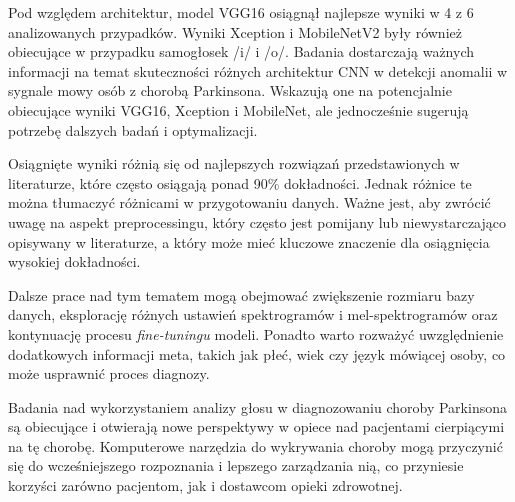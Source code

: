 Pod względem architektur, model VGG16 osiągnął najlepsze wyniki w 4 z 6 analizowanych przypadków.
Wyniki Xception i MobileNetV2 były również obiecujące w przypadku samogłosek /i/ i /o/.
Badania dostarczają ważnych informacji na temat skuteczności różnych architektur CNN w detekcji anomalii w sygnale mowy osób z chorobą Parkinsona.
Wskazują one na potencjalnie obiecujące wyniki VGG16, Xception i MobileNet, ale jednocześnie sugerują potrzebę dalszych badań i optymalizacji.

Osiągnięte wyniki  różnią się od najlepszych rozwiązań przedstawionych w literaturze, które często osiągają ponad 90\% dokładności.
Jednak różnice te można tłumaczyć różnicami w przygotowaniu danych.
Ważne jest, aby zwrócić uwagę na aspekt preprocessingu, który często jest pomijany lub niewystarczająco opisywany w literaturze, a który może mieć kluczowe znaczenie dla osiągnięcia wysokiej dokładności.

Dalsze prace nad tym tematem mogą obejmować zwiększenie rozmiaru bazy danych, eksplorację różnych ustawień spektrogramów i mel-spektrogramów oraz kontynuację procesu \emph{fine-tuningu} modeli.
Ponadto warto rozważyć uwzględnienie dodatkowych informacji meta, takich jak płeć, wiek czy język mówiącej osoby, co może usprawnić proces diagnozy.

Badania nad wykorzystaniem analizy głosu w diagnozowaniu choroby Parkinsona są obiecujące i otwierają nowe perspektywy w opiece nad pacjentami cierpiącymi na tę chorobę.
Komputerowe narzędzia do wykrywania choroby mogą przyczynić się do wcześniejszego rozpoznania i lepszego zarządzania nią, co przyniesie korzyści zarówno pacjentom, jak i dostawcom opieki zdrowotnej.